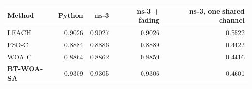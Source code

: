 \begin{tabular}{lrrrr}
\toprule
Method & Python & ns-3 & ns-3 + fading & ns-3, one shared channel \\
\midrule
LEACH & 0.9026 & 0.9027 & 0.9026 & 0.5522 \\
PSO-C & 0.8884 & 0.8886 & 0.8889 & 0.4422 \\
WOA-C & 0.8864 & 0.8862 & 0.8859 & 0.4416 \\
\textbf{BT-WOA-SA} & 0.9309 & 0.9305 & 0.9306 & 0.4601 \\
\bottomrule
\end{tabular}
